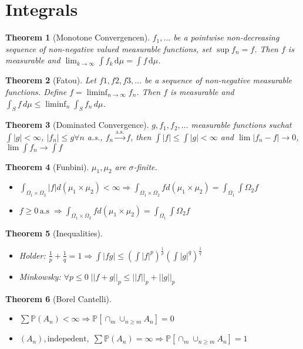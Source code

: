 \documentclass{article}
\newtheorem{theorem}{Theorem}
\begin{document}
\section{Integrals}
\begin{theorem}[Monotone Convergencen]
  $f_1, \ldots$  be a pointwise non-decreasing sequence of non-negative valued measurable functions, set $\sup f_n = f$. Then $f$ is measurable and
$\lim_{k\to\infty} \int f_k \, \mathrm{d}\mu = \int f \, \mathrm{d}\mu$.
\end{theorem}
\begin{theorem}[Fatou]
  Let $f1, f2, f3, \ldots$ be a sequence of non-negative measurable functions.  Define $f = \liminf_{n\to\infty} f_n$.
Then $f$ is measurable and $\int_S f\,d\mu \le \liminf_n \int_S f_n\,d\mu$.

\end{theorem}
\begin{theorem}[Dominated Convergence]
  $g, f_1, f_2, \ldots$ measurable functions suchat $\int |g| < \infty$, $|f_n| \le g \forall n$ a.s., $f_n \overset{\text{a.s.}}\rightarrow f$, then
  $\int |f| \le \int |g| < \infty$ and $\lim |f_n - f| \rightarrow 0$, $\lim \int f_n \rightarrow \int f$
\end{theorem}
\begin{theorem}[Funbini]
  $\mu_1, \mu_2$ are $\sigma$-finite.
  \begin{itemize}
  \item $\int_{\Omega_1 \times \Omega_2} |f| d(\mu_1 \times \mu_2) < \infty \Rightarrow
    \int_{\Omega_1 \times \Omega_2} f d(\mu_1 \times \mu_2)
    = \int_{\Omega_1}\int{\Omega_2} f$
  \item $f \ge 0 \, \text{a.s}\; \Rightarrow
    \int_{\Omega_1 \times \Omega_2} f d(\mu_1 \times \mu_2)
    = \int_{\Omega_1}\int{\Omega_2} f$
  \end{itemize}
\end{theorem}
\begin{theorem}[Inequalities]
  \begin{itemize}
  \item Holder: $ \frac1p + \frac1q = 1 \Rightarrow \int |fg| \le (\int |f|^p)^{\frac 1p}(\int |g|^q)^{\frac 1q}$
  \item Minkowsky: $\forall p \le 0 \; ||f + g||_p \le ||f||_p + ||g||_p$
  \end{itemize}
\end{theorem}
\begin{theorem}[Borel Cantelli]
  \begin{itemize}
  \item $\sum \mathbb P(A_n) < \infty \Rightarrow \mathbb P[\cap_m \cup_{n \ge m} A_n] = 0$
  \item $(A_n) ,\text{indepedent}, \; \sum \mathbb P(A_n) = \infty \Rightarrow \mathbb P[\cap_m \cup_{n \ge m} A_n] = 1$
  \end{itemize}
\end{theorem}
\end{document}

